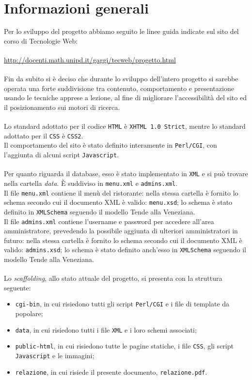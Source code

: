 \documentclass[../relazione.tex]{subfiles}
\begin{document}
\section{Informazioni generali}
	Per lo sviluppo del progetto abbiamo seguito le linee guida indicate sul sito del corso di Tecnologie Web:
	\\\\\url{http://docenti.math.unipd.it/gaggi/tecweb/progetto.html}
	\\\\Fin da subito si è deciso che durante lo sviluppo dell'intero progetto si sarebbe operata una forte suddivisione tra contenuto, comportamento e presentazione usando le tecniche apprese a lezione, al fine di migliorare l'accessibilità del sito ed il posizionamento sui motori di ricerca.\\\\
	Lo standard adottato per il codice \texttt{HTML} è \texttt{XHTML 1.0 Strict}, mentre lo standard adottato per il \texttt{CSS} è \texttt{CSS2}.\\
	Il comportamento del sito è stato definito interamente in \texttt{Perl/CGI}, con l'aggiunta di alcuni script \texttt{Javascript}.\\\\
	Per quanto riguarda il database, esso è stato implementato in \texttt{XML} e si può trovare nella cartella \textit{data}. È suddiviso in \texttt{menu.xml} e \texttt{admins.xml}.\\
	Il file \texttt{menu.xml} contiene il menù del ristorante: nella stessa cartella è fornito lo schema secondo cui il documento XML è valido: \texttt{menu.xsd}; lo schema è stato definito in \texttt{XMLSchema} seguendo il modello Tende alla Veneziana.\\
	Il file \texttt{admins.xml} contiene l'username e password per accedere all'area amministratore, prevedendo la possibile aggiunta di ulteriori amministratori in futuro: nella stessa cartella è fornito lo schema secondo cui il documento XML è valido: \texttt{admins.xsd}; lo schema è stato definito anch'esso in \texttt{XMLSchema} seguendo il modello Tende alla Veneziana.\\\\
	Lo \textit{scaffolding}, allo stato attuale del progetto, si presenta con la struttura seguente:
	\begin{itemize}
		\item \texttt{cgi-bin}, in cui risiedono tutti gli script \texttt{Perl/CGI} e i file di template da popolare;
		\item \texttt{data}, in cui risiedono tutti i file \texttt{XML} e i loro schemi associati;
		\item \texttt{public-html}, in cui risiedono tutte le pagine statiche, i file \texttt{CSS}, gli script \texttt{Javascript} e le immagini;
		\item \texttt{relazione}, in cui risiede il presente documento, \texttt{relazione.pdf}.
	\end{itemize}
\end{document}
